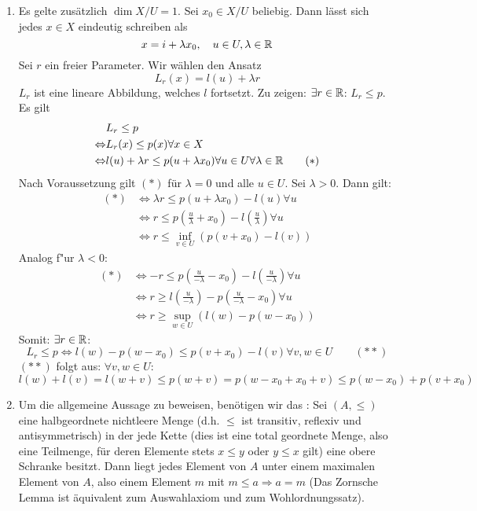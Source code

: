 \begin{beweis}
	\begin{enumerate}
		\item Es gelte zus\"atzlich $ \dim X/U=1 $. Sei $ x_0\in X/U $ beliebig. Dann l\"asst sich jedes $ x\in X $ eindeutig schreiben als
		\[ x=i+\lambda x_0,\quad u\in U,\lambda\in\mathbb{R} \]
		Sei $ r $ ein freier Parameter. Wir w\"ahlen den Ansatz
		\[ L_r(x)=l(u)+\lambda r \]
		$ L_r $ ist eine lineare Abbildung, welches $ l $ fortsetzt. Zu zeigen: $ \exists r\in\mathbb{R} $: $ L_r\leq p $. Es gilt
		\begin{align*}
		&L_r\leq p\\
		\Leftrightarrow&L_r(x)\leq p(x)\forall x\in X\\
		\Leftrightarrow&l(u)+\lambda r\leq p(u+\lambda x_0)\forall u\in U\forall\lambda\in\mathbb{R}\qquad (\ast)
		\end{align*}
		Nach Voraussetzung gilt $ (\ast) $ f\"ur $ \lambda=0 $ und alle $ u\in U $. Sei $ \lambda>0 $. Dann gilt:
		\begin{align*}
		(\ast)&\Leftrightarrow\lambda r\leq p(u+\lambda x_0)-l(u)\forall u\\
		&\Leftrightarrow r\leq p\left(\frac{u}{\lambda}+x_0\right)-l\left(\frac{u}{\lambda}\right)\forall u\\
		&\Leftrightarrow r\leq\inf_{v\in U}\left(p\left(v+x_0\right)-l\left(v\right)\right)
		\end{align*}
		Analog f"ur $ \lambda<0 $:
		\begin{align*}
		(\ast)&\Leftrightarrow -r\leq p\left(\frac{u}{-\lambda}-x_0\right)-l\left(
		\frac{u}{-\lambda}\right)\forall u\\
		&\Leftrightarrow r\geq l\left(\frac{u}{-\lambda}\right)-p\left(\frac{u}{-\lambda}-x_0\right)\forall u\\
		&\Leftrightarrow r\geq\sup_{w\in U}\left(l(w)-p(w-x_0)\right)
		\end{align*}
		Somit: $ \exists r\in\mathbb{R} $:
		\[ L_r\leq p\Leftrightarrow l(w)-p(w-x_0)\leq p(v+x_0)-l(v)\forall v,w\in U\qquad(\ast\ast) \]
		$ (\ast\ast) $ folgt aus: $ \forall v,w\in U $:
		\[ l(w)+l(v)=l(w+v)\leq p(w+v)=p(w-x_0+x_0+v)\leq p(w-x_0)+p(v+x_0) \]
		\item Um die allgemeine Aussage zu beweisen, ben\"otigen wir das : Sei $ (A,\leq) $ eine halbgeordnete nichtleere Menge (d.h. $ \leq $ ist transitiv, reflexiv und antisymmetrisch) in der jede Kette (dies ist eine total geordnete Menge, also eine Teilmenge, f\"ur deren Elemente stets $ x\leq y $ oder $ y\leq x $ gilt) eine obere Schranke besitzt. Dann liegt jedes Element von $ A $ unter einem maximalen Element von $ A $, also einem Element $ m $ mit $ m\leq a\Rightarrow a=m $ (Das Zornsche Lemma ist \"aquivalent zum Auswahlaxiom und zum Wohlordnungssatz).\\

\end{enumerate}
\end{beweis}
